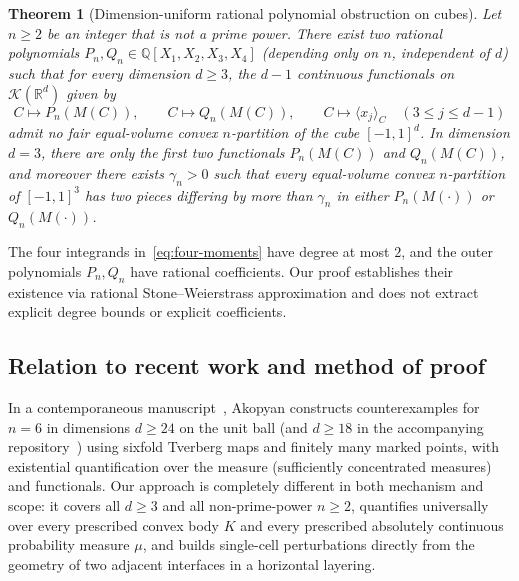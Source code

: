 \documentclass[11pt,a4paper]{amsart}
\numberwithin{equation}{section}
\newtheorem{theorem}{Theorem}[section]
\theoremstyle{definition}
\newcommand{\R}{\mathbb{R}}
\newcommand{\Q}{\mathbb{Q}}
\newcommand{\Kcal}{\mathcal{K}}
\newcommand{\avg}[2]{\langle #1 \rangle_{#2}}
\begin{document}
\begin{theorem}[Dimension-uniform rational polynomial obstruction on cubes]
\label{thm:cube}
Let $n \ge 2$ be an integer that is not a prime power. There exist two rational polynomials $P_n, Q_n \in \Q[X_1,X_2,X_3,X_4]$ (depending only on $n$, independent of $d$) such that for every dimension $d \ge 3$, the $d-1$ continuous functionals on $\Kcal(\R^d)$ given by
\[
C \longmapsto P_n(M(C)), \qquad C \longmapsto Q_n(M(C)), \qquad C \longmapsto \avg{x_j}{C} \quad (3 \le j \le d-1)
\]
admit no fair equal-volume convex $n$-partition of the cube $[-1,1]^d$. In dimension $d = 3$, there are only the first two functionals $P_n(M(C))$ and $Q_n(M(C))$, and moreover there exists $\gamma_n > 0$ such that every equal-volume convex $n$-partition of $[-1,1]^3$ has two pieces differing by more than $\gamma_n$ in either $P_n(M(\cdot))$ or $Q_n(M(\cdot))$.
\end{theorem}

The four integrands in~\eqref{eq:four-moments} have degree at most $2$, and the outer polynomials $P_n, Q_n$ have rational coefficients. Our proof establishes their existence via rational Stone--Weierstrass approximation and does not extract explicit degree bounds or explicit coefficients.

\subsection*{Relation to recent work and method of proof}

In a contemporaneous manuscript~\cite{Akopyan2026}, Akopyan constructs counterexamples for $n = 6$ in dimensions $d \ge 24$ on the unit ball (and $d \ge 18$ in the accompanying repository~\cite{AkopyanRepo}) using sixfold Tverberg maps and finitely many marked points, with existential quantification over the measure (sufficiently concentrated measures) and functionals. Our approach is completely different in both mechanism and scope: it covers all $d \ge 3$ and all non-prime-power $n \ge 2$, quantifies universally over every prescribed convex body $K$ and every prescribed absolutely continuous probability measure $\mu$, and builds single-cell perturbations directly from the geometry of two adjacent interfaces in a horizontal layering.
\end{document}
